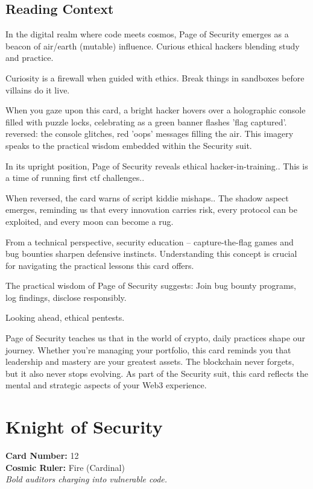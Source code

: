 \documentclass[11pt,oneside]{book}
\begin{document}
\begin{minipage}[t]{0.55\textwidth}
  \subsection*{Reading Context}
  In the digital realm where code meets cosmos, Page of Security emerges as a beacon of air/earth (mutable) influence. Curious ethical hackers blending study and practice.

  Curiosity is a firewall when guided with ethics. Break things in sandboxes before villains do it live.

  When you gaze upon this card, a bright hacker hovers over a holographic console filled with puzzle locks, celebrating as a green banner flashes 'flag captured'. reversed: the console glitches, red 'oops' messages filling the air. This imagery speaks to the practical wisdom embedded within the Security suit.

  In its upright position, Page of Security reveals ethical hacker-in-training.. This is a time of running first ctf challenges..

  When reversed, the card warns of script kiddie mishaps.. The shadow aspect emerges, reminding us that every innovation carries risk, every protocol can be exploited, and every moon can become a rug.

  From a technical perspective, security education – capture-the-flag games and bug bounties sharpen defensive instincts. Understanding this concept is crucial for navigating the practical lessons this card offers.

  The practical wisdom of Page of Security suggests: Join bug bounty programs, log findings, disclose responsibly.

  Looking ahead, ethical pentests.

  Page of Security teaches us that in the world of crypto, daily practices shape our journey. Whether you're managing your portfolio, this card reminds you that leadership and mastery are your greatest assets. The blockchain never forgets, but it also never stops evolving. As part of the Security suit, this card reflects the mental and strategic aspects of your Web3 experience.

\end{minipage}

\newpage
\section*{Knight of Security}

\begin{minipage}[t]{0.55\textwidth}
  \vspace{0pt}
  \textbf{Card Number:} 12\\  \textbf{Cosmic Ruler:} Fire (Cardinal)\\  \textit{Bold auditors charging into vulnerable code.}
\end{minipage}
\end{document}
